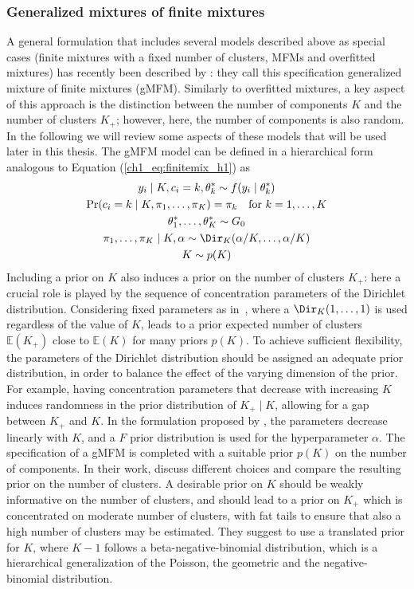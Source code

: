\subsubsection*{Generalized mixtures of finite mixtures}
A general formulation that includes several models described above as special cases (finite mixtures with a fixed number of clusters, MFMs and overfitted mixtures) has recently been described by \textcite{fruhwirthschnatter2020}: they call this specification generalized mixture of finite mixtures (gMFM). Similarly to overfitted mixtures, a key aspect of this approach is the distinction between the number of components $K$ and the number of clusters $K_+$; however, here, the number of components is also random. 
In the following we will review some aspects of these models that will be used later in this thesis.
The gMFM model can be defined in a hierarchical form analogous to Equation (\ref{ch1_eq:finitemix_h1}) as
\begin{equation*}
\begin{gathered}
y_i \mid K, c_i = k, \theta^*_k \sim f(y_i\mid\theta^*_k)\\
\Pr(c_i = k \mid K, \pi_1,\dots,\pi_K) = \pi_k \quad \text{for } k = 1,\dots,K\\ 
\theta^*_1,\dots,\theta^*_K \sim G_0\\
\pi_1,\dots,\pi_K \mid K, \alpha \sim \Dir_K(\alpha / K, \dots, \alpha / K)\\
K \sim p(K)
\end{gathered}
\label{ch1_eq:gMFM}
\end{equation*}
Including a prior on $K$ also induces a prior on the number of clusters $K_+$: here a crucial role is played by the sequence of concentration parameters of the Dirichlet distribution. Considering fixed parameters as in~\textcite{miller2018}, where a $\Dir_K(1,\dots,1)$ is used regardless of the value of $K$, leads to a prior expected number of clusters $\mathbb{E}(K_+)$ close to $\mathbb{E}(K)$ for many priors $p(K)$. 
To achieve sufficient flexibility, the parameters of the Dirichlet distribution should be assigned an adequate prior distribution, in order to balance the effect of the varying dimension of the prior.
For example, having concentration parameters that decrease with increasing $K$ induces randomness in the prior distribution of $K_+\mid K$, allowing for a gap between $K_+$ and $K$. In the formulation proposed by \textcite{fruhwirthschnatter2020}, the parameters decrease linearly with $K$, and a $F$ prior distribution is used for the hyperparameter $\alpha$.
The specification of a gMFM is completed with a suitable prior $p(K)$ on the number of components. In their work, \textcite{fruhwirthschnatter2020} discuss different choices and compare the resulting prior on the number of clusters. 
A desirable prior on $K$ should be weakly informative on the number of clusters, and should lead to a prior on $K_+$ which is concentrated on moderate number of clusters, with fat tails to ensure that also a high number of clusters may be estimated. They suggest to use a translated prior for $K$, where $K-1$ follows a beta-negative-binomial distribution, which is a hierarchical generalization of the Poisson, the geometric and the negative-binomial distribution.

